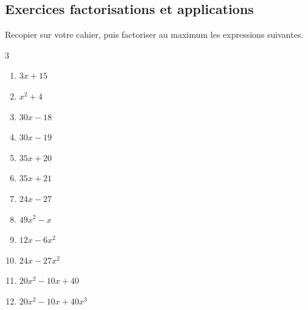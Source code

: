 \documentclass[main.tex]{subfiles}
\begin{document}

\newpage 
{}  
\pagestyle{scrheadings} %
\onehalfspacing
\subsection{Exercices factorisations et applications} 

\begin{exercise} \label{chapter03:exercices:factoriser01}
	Recopier sur votre cahier, puis factoriser au maximum les expressions suivantes.
	\begin{multicols}{3} 
		\begin{enumerate}[label={$\Alph*(x)=$}, leftmargin=*] 
			\item $3x+15$
			\item $x^2+4$
			\item $30x-18$  
			\item $30x-19$  
			\item $35x+20$ 
			\item $35x+21$   
			\item $24x-27$
			\item $49x^2-x$ 
			\item $12x-6x^2$ 
			\item $24x-27x^2$
			\item $20x^2-10x+40$
			\item $20x^2-10x+40x^3$ 
		\end{enumerate} 
	\end{multicols}
\end{exercise}
\end{document}
